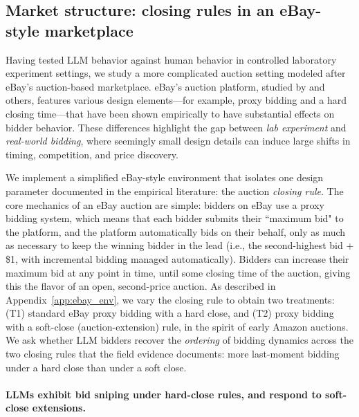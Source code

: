 \documentclass[acmsmall,screen,review]{acmart}
\begin{document}
\subsection{\texorpdfstring{Market structure: closing rules in an eBay-style marketplace}{Market structure: closing rules in an eBay-style marketplace}}\label{sec:ebay_market}


Having tested LLM behavior against human behavior in controlled laboratory experiment settings, we study a more complicated auction setting modeled after eBay's  auction-based marketplace. eBay's auction platform, studied by \citet{einav2011learning} and others, features various design elements---for example, proxy bidding and a hard closing time---that have been shown empirically to have substantial effects on bidder behavior. These differences highlight the gap between \textit{lab experiment} and \textit{real-world bidding}, where seemingly small design details can induce large shifts in timing, competition, and price discovery.

We implement a simplified eBay-style environment that isolates one design parameter documented in the empirical literature: the auction \emph{closing rule}. The core mechanics of an eBay auction are simple: bidders on eBay use a proxy bidding system, which means that each bidder submits their ``maximum bid" to the platform, and the platform automatically bids on their behalf, only as much as necessary to keep the winning bidder in the lead (i.e., the second-highest bid + \$1, with incremental bidding managed automatically).
Bidders can increase their maximum bid at any point in time, until some closing time of
the auction, giving this the flavor
of an open, second-price auction.
As described in Appendix~\ref{app:ebay_env}, we vary the closing rule to obtain two treatments: (T1) standard eBay proxy bidding with a hard close, and (T2) proxy bidding with a soft-close (auction-extension) rule, in the spirit of early Amazon auctions. We ask whether LLM bidders recover the \emph{ordering} of bidding dynamics across the two closing rules that the field evidence documents: more last-moment bidding under a hard close than under a soft close.


\paragraph{LLMs exhibit bid sniping under hard-close rules, and respond to soft-close extensions.}\label{sec:ebay_sniping}
\end{document}
